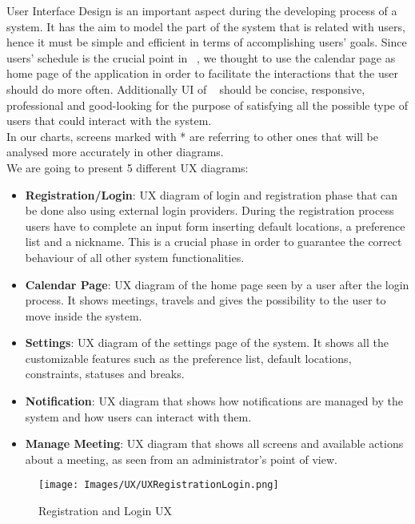 User Interface Design is an important aspect during the developing process of a system. It has the aim to model the part of the system that is related with users, hence it must be simple and efficient in terms of accomplishing users' goals. Since users' schedule is the crucial point in \projectname~, we thought to use the calendar page as home page of the application in order to facilitate the interactions that the user should do more often. Additionally UI of \projectname~ should be concise, responsive, professional and good-looking for the purpose of satisfying all the possible type of users that could interact with the system. \\
\newline
In our charts, screens marked with * are referring to other ones that will be analysed more accurately in other diagrams. \\
We are going to present 5 different UX diagrams:
\begin{itemize}
	\item{\textbf{Registration/Login}}: UX diagram of login and registration phase that can be done also using external login providers. During the registration process users have to complete an input form inserting default locations, a preference list and a nickname. This is a crucial phase in order to guarantee the correct behaviour of all other system functionalities.
	\item{\textbf{Calendar Page}}: UX diagram of the home page seen by a user after the login process. It shows meetings, travels and gives the possibility to the user to move inside the system.
	\item{\textbf{Settings}}: UX diagram of the settings page of the system. It shows all the customizable features such as the preference list, default locations, constraints, statuses and breaks.
	\item{\textbf{Notification}}: UX diagram that shows how notifications are managed by the system and how users can interact with them.
	\item{\textbf{Manage Meeting}}: UX diagram that shows all screens and available actions about a meeting, as seen from an administrator's point of view.
\end{itemize}

\begin{figure}[h]
	\centering\texttt{[image: Images/UX/UXRegistrationLogin.png]}{}
	\caption{Registration and Login UX}
\end{figure}

